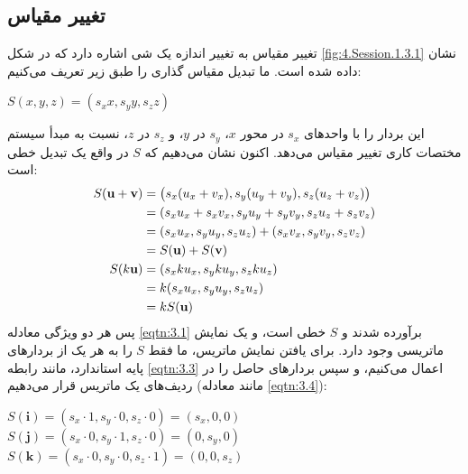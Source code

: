 \subsection{\textbf{تغییر مقیاس}}
\label{subsec:3.1.3}
{
    \Large
    \begin{spacing}{1.5}
        تغییر مقیاس به تغییر اندازه یک شی اشاره دارد که در شکل \ref{fig:4.Session.1.3.1} نشان داده شده است.
        ما تبدیل مقیاس گذاری را طبق زیر تعریف می‌کنیم:

        \begin{center}
            $S(x,y,z)=(s_{x}x,s_{y}y,s_{z}z)$
        \end{center}

        این بردار را با واحدهای $s_x$ در محور $x$، $s_y$ در $y$، و $s_z$ در $z$،
        نسبت به مبدأ سیستم مختصات کاری تغییر مقیاس می‌دهد.
        اکنون نشان می‌دهیم که $S$ در واقع یک تبدیل خطی است:
\textbf{\vspace{-20pt}}
        \begin{equation*}
            \centering
            \begin{split}
                S(\textbf{u}+\textbf{v})&=\left( s_{x}(u_{x}+v_{x}), s_{y}(u_{y}+v_{y}), s_{z}(u_{z}+v_{z}) \right) \\
                &=(s_{x}u_{x}+s_{x}v_{x}, s_{y}u_{y}+s_{y}v_{y}, s_{z}u_{z}+s_{z}v_{z}) \\
                &=(s_{x}u_{x}, s_{y}u_{y}, s_{z}u_{z})+(s_{x}v_{x}, s_{y}v_{y}, s_{z}v_{z}) \\
                &=S(\textbf{u})+S(\textbf{v}) \\
                S(k\textbf{u})&=(s_{x}ku_{x}, s_{y}ku_{y}, s_{z}ku_{z}) \\
                &=k(s_{x}u_{x}, s_{y}u_{y}, s_{z}u_{z}) \\
                &=kS(\textbf{u}) \\
            \end{split}
        \end{equation*}
        پس هر دو ویژگی معادله \ref{eqtn:3.1} برآورده شدند و $S$ خطی است،
        و یک نمایش ماتریسی وجود دارد. برای یافتن نمایش ماتریس، ما فقط $S$ را به هر یک از بردارهای پایه استاندارد، مانند رابطه \ref{eqtn:3.3} اعمال می‌کنیم،
        و سپس بردارهای حاصل را در ردیف‌های یک ماتریس قرار می‌دهیم (مانند معادله \ref{eqtn:3.4}):

        \begin{center}
            $S(\textbf{i})=(s_x\cdot 1,s_y\cdot 0,s_z\cdot 0)=(s_x,0,0)$ \\
            $S(\textbf{j})=(s_x\cdot 0,s_y\cdot 1,s_z\cdot 0)=(0,s_y,0)$ \\
            $S(\textbf{k})=(s_x\cdot 0,s_y\cdot 0,s_z\cdot 1)=(0,0,s_z)$
        \end{center}


\end{spacing}}
